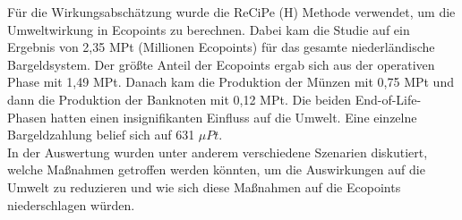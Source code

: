 \documentclass[12pt]{article}
\begin{document}
\FloatBarrier
\noindent Für die Wirkungsabschätzung wurde die ReCiPe (H) Methode verwendet, um die Umweltwirkung in Ecopoints zu berechnen. Dabei kam die Studie auf ein Ergebnis von 2,35 MPt (Millionen Ecopoints) für das gesamte niederländische Bargeldsystem. Der größte Anteil der Ecopoints ergab sich aus der operativen Phase mit 1,49 MPt. Danach kam die Produktion der Münzen mit 0,75 MPt und dann die Produktion der Banknoten mit 0,12 MPt. Die beiden End-of-Life-Phasen hatten einen insignifikanten Einfluss auf die Umwelt. Eine einzelne Bargeldzahlung belief sich auf 631 \begin{math}\mu Pt\end{math}.\\
In der Auswertung wurden unter anderem verschiedene Szenarien diskutiert, welche Maßnahmen getroffen werden könnten, um die Auswirkungen auf die Umwelt zu reduzieren und wie sich diese Maßnahmen auf die Ecopoints niederschlagen würden.
\end{document}
